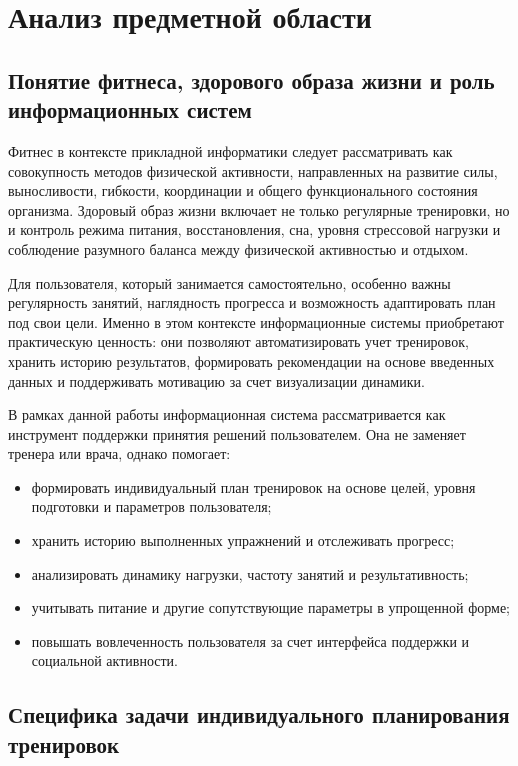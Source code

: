 \section{Анализ предметной области}

\subsection{Понятие фитнеса, здорового образа жизни и роль информационных систем}

Фитнес в контексте прикладной информатики следует рассматривать как совокупность методов физической активности, направленных на развитие силы, выносливости, гибкости, координации и общего функционального состояния организма. Здоровый образ жизни включает не только регулярные тренировки, но и контроль режима питания, восстановления, сна, уровня стрессовой нагрузки и соблюдение разумного баланса между физической активностью и отдыхом.

Для пользователя, который занимается самостоятельно, особенно важны регулярность занятий, наглядность прогресса и возможность адаптировать план под свои цели. Именно в этом контексте информационные системы приобретают практическую ценность: они позволяют автоматизировать учет тренировок, хранить историю результатов, формировать рекомендации на основе введенных данных и поддерживать мотивацию за счет визуализации динамики.

В рамках данной работы информационная система рассматривается как инструмент поддержки принятия решений пользователем. Она не заменяет тренера или врача, однако помогает:
\begin{itemize}
	\item формировать индивидуальный план тренировок на основе целей, уровня подготовки и параметров пользователя;
	\item хранить историю выполненных упражнений и отслеживать прогресс;
	\item анализировать динамику нагрузки, частоту занятий и результативность;
	\item учитывать питание и другие сопутствующие параметры в упрощенной форме;
	\item повышать вовлеченность пользователя за счет интерфейса поддержки и социальной активности.
\end{itemize}

\subsection{Специфика задачи индивидуального планирования тренировок}

